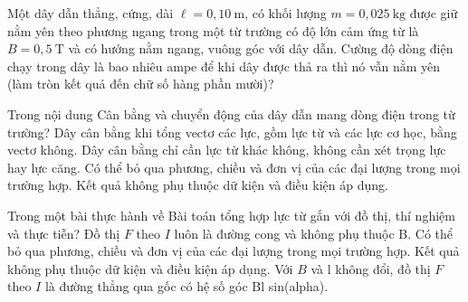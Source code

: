 \begin{ex}
Một dây dẫn thẳng, cứng, dài $\ell=0,10\mathrm{~m}$, có khối lượng $m=0,025\mathrm{~kg}$ được giữ nằm yên theo phương ngang trong một từ trường có độ lớn cảm ứng từ là $B=0,5\mathrm{~T}$ và có hướng nằm ngang, vuông góc với dây dẫn. Cường độ dòng điện chạy trong dây là bao nhiêu ampe để khi dây được thả ra thì nó vẫn nằm yên (làm tròn kết quả đến chữ số hàng phần mười)?
\shortans{}
\end{ex}

\begin{ex}
Trong nội dung Cân bằng và chuyển động của dây dẫn mang dòng điện trong từ trường?
\choice
{\True Dây cân bằng khi tổng vectơ các lực, gồm lực từ và các lực cơ học, bằng vectơ không.}
{Dây cân bằng chỉ cần lực từ khác không, không cần xét trọng lực hay lực căng.}
{Có thể bỏ qua phương, chiều và đơn vị của các đại lượng trong mọi trường hợp.}
{Kết quả không phụ thuộc dữ kiện và điều kiện áp dụng.}
\end{ex}

\begin{ex}
Trong một bài thực hành về Bài toán tổng hợp lực từ gắn với đồ thị, thí nghiệm và thực tiễn?
\choice
{Đồ thị $F$ theo $I$ luôn là đường cong và không phụ thuộc B.}
{Có thể bỏ qua phương, chiều và đơn vị của các đại lượng trong mọi trường hợp.}
{Kết quả không phụ thuộc dữ kiện và điều kiện áp dụng.}
{\True Với $B$ và l không đổi, đồ thị $F$ theo $I$ là đường thẳng qua gốc có hệ số góc Bl sin(alpha).}
\end{ex}

